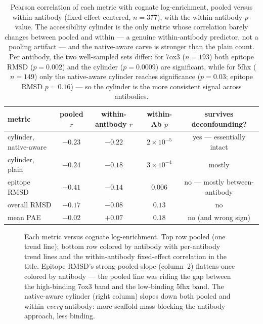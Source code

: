 \begin{table}[h]\centering
\begin{tabular}{lcccc}
\toprule
metric & pooled $r$ & within-antibody $r$ & within-Ab $p$ & survives deconfounding? \\
\midrule
cylinder, native-aware & $-0.23$ & $\mathbf{-0.22}$ & $2\times10^{-5}$ & yes --- essentially intact \\
cylinder, plain        & $-0.24$ & $-0.18$ & $3\times10^{-4}$ & mostly \\
epitope RMSD           & $-0.41$ & $-0.14$ & $0.006$ & no --- mostly between-antibody \\
overall RMSD           & $-0.17$ & $-0.08$ & $0.13$ & no \\
mean PAE               & $-0.02$ & $+0.07$ & $0.18$ & no (and wrong sign) \\
\bottomrule
\end{tabular}
\caption{Pearson correlation of each metric with cognate log-enrichment, pooled versus
within-antibody (fixed-effect centered, $n=\num{377}$), with the within-antibody $p$-value. The
accessibility cylinder is the only metric whose correlation barely changes between pooled and
within --- a genuine within-antibody predictor, not a pooling artifact --- and the native-aware
carve is stronger than the plain count. Per antibody, the two well-sampled sets differ: for 7ox3
($n=\num{193}$) both epitope RMSD ($p=0.002$) and the cylinder ($p=0.0009$) are significant, while
for 5fhx ($n=\num{149}$) only the native-aware cylinder reaches significance ($p=0.03$; epitope
RMSD $p=0.16$) --- so the cylinder is the more consistent signal across antibodies.}
\label{tab:metricbinding}
\end{table}

\begin{figure}[h]\centering
{}
\caption{Each metric versus cognate log-enrichment. Top row pooled (one trend line); bottom row
colored by antibody with per-antibody trend lines and the within-antibody fixed-effect
correlation in the title. Epitope RMSD's strong pooled slope (column~2) flattens once colored by
antibody --- the pooled line was riding the gap between the high-binding 7ox3 band and the
low-binding 5fhx band. The native-aware cylinder (right column) slopes down both pooled and
within \emph{every} antibody: more scaffold mass blocking the antibody approach, less binding.}
\label{fig:metricbinding}
\end{figure}

